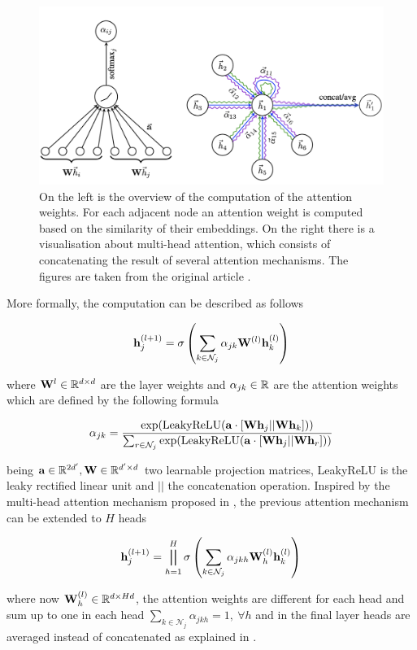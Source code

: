 \begin{figure}[ht]
    \centering
    \includegraphics[width=\textwidth]{imgs/gat.png}
    \caption{On the left is the overview of the computation of the attention weights. For each adjacent node an attention weight is computed based on the similarity of their embeddings. On the right there is a visualisation about multi-head attention, which consists of concatenating the result of several attention mechanisms. The figures are taken from the original article \cite{graphatt}.}
    \label{fig:gat}
\end{figure}

More formally, the computation can be described as follows

\begin{equation}
    {\mathbf h}_j^{(l+1)} = \sigma \left(\sum_{k \in \mathcal{N}_j} \alpha_{jk} {\mathbf W}^{(l)}{\mathbf h}_k^{(l)}\right)
\end{equation}

\noindent where ${\mathbf W}^{l}\in \mathbb{R}^{d\times d}$ are the layer weights and $\alpha_{jk} \in \mathbb{R}$ are the attention weights which are defined by the following formula

\begin{equation}
    \alpha_{jk} = \frac{\exp(\text{LeakyReLU}({\mathbf a} \cdot [{\mathbf W} {\mathbf h}_j||{\mathbf W} {\mathbf h}_k]))}{\sum_{r\in \mathcal{N}_j} \exp(\text{LeakyReLU}({\mathbf a} \cdot [{\mathbf W} {\mathbf h}_j||{\mathbf W} {\mathbf h}_r]))}
\end{equation}

\noindent being ${\mathbf a} \in \mathbb{R}^{2d'}, {\mathbf W} \in \mathbb{R}^{d'\times d}$ two learnable projection matrices, LeakyReLU is the leaky rectified linear unit \cite{leakyrelu} and $||$ the concatenation operation. Inspired by the multi-head attention mechanism proposed in \cite{transformer}, the previous attention mechanism can be extended to $H$ heads

\begin{equation}
    {\mathbf h}_j^{(l+1)} = \bigparallel_{h=1}^H \sigma \left(\sum_{k \in \mathcal{N}_j} \alpha_{jkh} {\mathbf W}^{(l)}_h{\mathbf h}_k^{(l)}\right)
\end{equation}

\noindent where now ${\mathbf W}^{(l)}_h \in \mathbb{R}^{d \times Hd}$, the attention weights are different for each head and sum up to one in each head $\sum_{k\in\mathcal{N}_j}\alpha_{jkh}=1,\ \forall h$ and in the final layer heads are averaged instead of concatenated as explained in \cite{graphatt}.